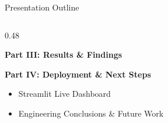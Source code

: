 \documentclass[aspectratio=169, 10pt]{beamer}
\begin{document}
\begin{frame}{Presentation Outline}
\begin{columns}[t]
\begin{column}{0.48\textwidth}
\begin{block}{\textbf{Part III: Results \& Findings}}
\begin{itemize}
                \end{itemize}
            \end{block}
            \vspace{0.2cm}
            \begin{block}{\textbf{Part IV: Deployment \& Next Steps}}
                \begin{itemize}
                    \item Streamlit Live Dashboard
                    \item Engineering Conclusions \& Future Work
                \end{itemize}
            \end{block}
        \end{column}
    \end{columns}
\end{frame}
\end{document}
